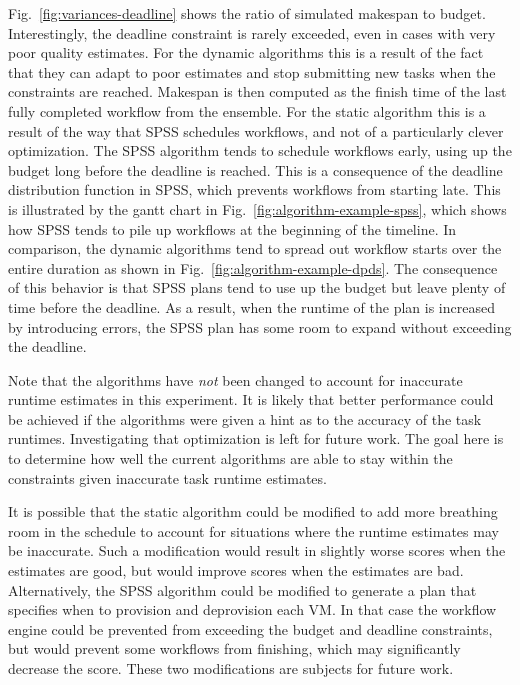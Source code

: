 \documentclass[conference]{IEEEtran}
\begin{document}
Fig.~\ref{fig:variances-deadline} shows the ratio of simulated makespan to budget.
Interestingly, the deadline constraint is rarely exceeded, even in cases with
very poor quality estimates. For the dynamic algorithms this is a result of the
fact that they can adapt to poor estimates and stop submitting new tasks when
the constraints are reached. Makespan is then computed as the finish time of the
last fully completed workflow from the ensemble. For the static algorithm this
is a result of the way that SPSS schedules workflows, and not of a particularly
clever optimization. The SPSS algorithm tends to schedule workflows early, using
up the budget long before the deadline is reached. This is a consequence of the
deadline distribution function in SPSS, which prevents workflows from starting
late. This is illustrated by the gantt chart in
Fig.~\ref{fig:algorithm-example-spss}, which shows how SPSS tends to pile up
workflows at the beginning of the timeline.
In comparison, the dynamic algorithms tend to spread out workflow starts over
the entire duration as shown in Fig.~\ref{fig:algorithm-example-dpds}. The
consequence of this behavior is that SPSS plans tend to use up the budget but
leave plenty of time before the deadline.
As a result, when the runtime of the plan is increased by introducing errors,
the SPSS plan has some room to expand without exceeding the deadline.

Note that the algorithms have \textit{not} been changed to account for
inaccurate runtime estimates in this experiment. It is likely that better
performance could be achieved if the algorithms were given a hint as to the
accuracy of the task runtimes. Investigating that optimization is left for
future work. 
The goal here is to determine how well the current algorithms are
able to stay within the constraints given inaccurate task runtime estimates.

It is possible that the static algorithm could be modified to add more
breathing room in the schedule to account for situations where the runtime
estimates may be inaccurate. Such a modification would result in slightly
worse scores when the estimates are good, but would improve scores when the
estimates are bad. Alternatively, the SPSS algorithm could be modified to
generate a plan that specifies when to provision and deprovision each VM. In
that case the workflow engine could be prevented from exceeding the budget
and deadline constraints, but would prevent some workflows from finishing,
which may significantly decrease the score. These two modifications are
subjects for future work.
\end{document}

